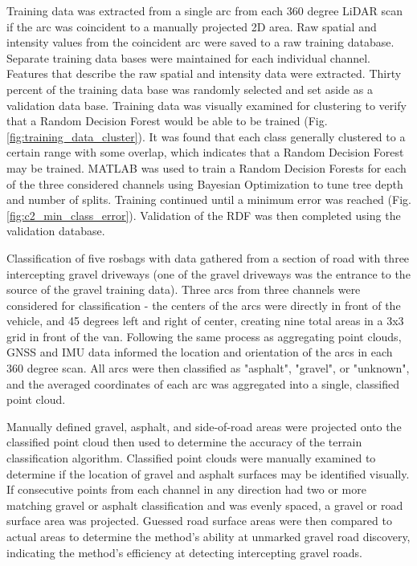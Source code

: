 \documentclass[numbered,pdftex]{ohio-etd}
\begin{document}
{		{Training data was extracted from a single arc from each 360 degree LiDAR scan if the arc was coincident to a manually projected 2D area. Raw spatial and intensity values from the coincident arc were saved to a raw training database. Separate training data bases were maintained for each individual channel. Features that describe the raw spatial and intensity data were extracted. Thirty percent of the training data base was randomly selected and set aside as a validation data base. Training data was visually examined for clustering to verify that a Random Decision Forest would be able to be trained (Fig. \ref{fig:training_data_cluster}). It was found that each class generally clustered to a certain range with some overlap, which indicates that a Random Decision Forest may be trained. MATLAB was used to train a Random Decision Forests for each of the three considered channels using Bayesian Optimization to tune tree depth and number of splits. Training continued until a minimum error was reached (Fig. \ref{fig:c2_min_class_error}). Validation of the RDF was then completed using the validation database.}
		
		{Classification of five rosbags with data gathered from a section of road with three intercepting gravel driveways (one of the gravel driveways was the entrance to the source of the gravel training data). Three arcs from three channels were considered for classification - the centers of the arcs were directly in front of the vehicle, and 45 degrees left and right of center, creating nine total areas in a 3x3 grid in front of the van. Following the same process as aggregating point clouds, GNSS and IMU data informed the location and orientation of the arcs in each 360 degree scan. All arcs were then classified as "asphalt", "gravel", or "unknown", and the averaged coordinates of each arc was aggregated into a single, classified point cloud.}
		
		{Manually defined gravel, asphalt, and side-of-road areas were projected onto the classified point cloud then used to determine the accuracy of the terrain classification algorithm. Classified point clouds were manually examined to determine if the location of gravel and asphalt surfaces may be identified visually. If consecutive points from each channel in any direction had two or more matching gravel or asphalt classification and was evenly spaced, a gravel or road surface area was projected. Guessed road surface areas were then compared to actual areas to determine the method's ability at unmarked gravel road discovery, indicating the method's efficiency at detecting intercepting gravel roads.}
		
}
\end{document}
